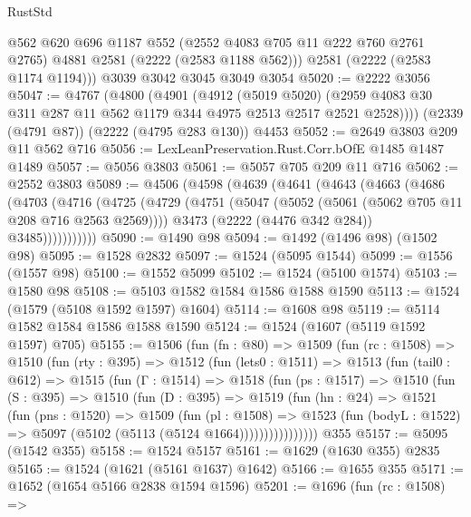 \begin{lexlean}{RustStd}
\begin{coremodule}
        @562
        @620
        @696
        @1187
        @552
        (@2552 @4083 @705 @11 @222 @760 @2761 @2765)
        @4881
        @2581
        (@2222 (@2583 @1188 @562)))
      @2581
      (@2222 (@2583 @1174 @1194)))
    @3039
    @3042
    @3045
    @3049
    @3054
@5020 := @2222 @3056
@5047 := @4767
    (@4800
      (@4901
        (@4912
          (@5019 @5020)
          (@2959 @4083 @30 @311 @287 @11 @562 @1179 @344 @4975 @2513 @2517 @2521 @2528))))
    (@2339 (@4791 @87))
    (@2222 (@4795 @283 @130))
    @4453
@5052 := @2649 @3803 @209 @11 @562 @716
@5056 := LexLeanPreservation.Rust.Corr.bOfE @1485 @1487 @1489
@5057 := @5056 @3803
@5061 := @5057 @705 @209 @11 @716
@5062 := @2552 @3803
@5089 := @4506
    (@4598
      (@4639
        (@4641
          (@4643
            (@4663
              (@4686
                (@4703
                  (@4716
                    (@4725
                      (@4729
                        (@4751
                          (@5047 (@5052 (@5061 (@5062 @705 @11 @208 @716 @2563 @2569))))
                          @3473
                          (@2222 (@4476 @342 @284))
                          @3485)))))))))))
@5090 := @1490 @98
@5094 := @1492 (@1496 @98) (@1502 @98)
@5095 := @1528 @2832
@5097 := @1524 (@5095 @1544)
@5099 := @1556 (@1557 @98)
@5100 := @1552 @5099
@5102 := @1524 (@5100 @1574)
@5103 := @1580 @98
@5108 := @5103 @1582 @1584 @1586 @1588 @1590
@5113 := @1524 (@1579 (@5108 @1592 @1597) @1604)
@5114 := @1608 @98
@5119 := @5114 @1582 @1584 @1586 @1588 @1590
@5124 := @1524 (@1607 (@5119 @1592 @1597) @705)
@5155 := @1506
    (fun (fn : @80) =>
    @1509
      (fun (rc : @1508) =>
      @1510
        (fun (rty : @395) =>
        @1512
          (fun (lets0 : @1511) =>
          @1513
            (fun (tail0 : @612) =>
            @1515
              (fun (Γ : @1514) =>
              @1518
                (fun (ps : @1517) =>
                @1510
                  (fun (S : @395) =>
                  @1510
                    (fun (D : @395) =>
                    @1519
                      (fun (hn : @24) =>
                      @1521
                        (fun (pns : @1520) =>
                        @1509
                          (fun (pl : @1508) =>
                          @1523
                            (fun (bodyL : @1522) => @5097 (@5102 (@5113 (@5124 @1664))))))))))))))))
    @355
@5157 := @5095 (@1542 @355)
@5158 := @1524 @5157
@5161 := @1629 (@1630 @355) @2835
@5165 := @1524 (@1621 (@5161 @1637) @1642)
@5166 := @1655 @355
@5171 := @1652 (@1654 @5166 @2838 @1594 @1596)
@5201 := @1696
    (fun (rc : @1508) =>

\end{coremodule}
\end{lexlean}
